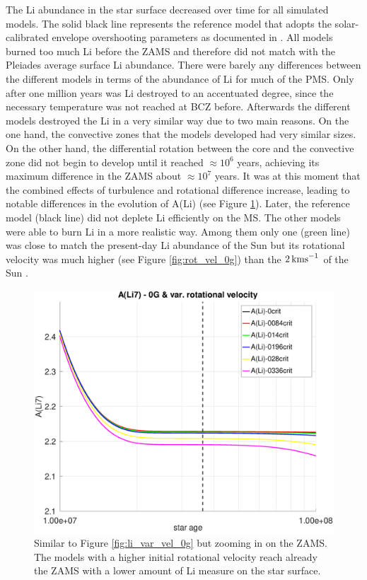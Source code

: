 \documentclass[fleqn,usenatbib]{mnras}
\begin{document}
The Li abundance in the star surface decreased over time for all simulated models. The solid black line represents the reference model that adopts the solar-calibrated envelope overshooting parameters as documented in \citet{Choi2016}. All models burned too much Li before the ZAMS and therefore did not match with the Pleiades average surface Li abundance. There were barely any differences between the different models in terms of the abundance of Li for much of the PMS. Only after one million years was Li destroyed to an accentuated degree, since the necessary temperature was not reached at BCZ before. Afterwards the different models destroyed the Li in a very similar way due to two main reasons. On the one hand, the convective zones that the models developed had very similar sizes. On the other hand, the differential rotation between the core and the convective zone did not begin to develop until it reached $ \approx 10^6$ years, achieving its maximum difference in the ZAMS about $ \approx 10^7$ years. It was at this moment that the combined effects of turbulence and rotational difference increase, leading to notable differences in the evolution of A(Li) (see Figure \ref{fig:li_var_vel_0g_z1}). Later, the reference model (black line) did not deplete Li efficiently on the MS. The other models were able to burn Li in a more realistic way. Among them only one (green line) was close to match the present-day Li abundance of the Sun but its rotational velocity was much higher (see Figure \ref{fig:rot_vel_0g}) than the $2\,\mathrm{kms}^{-1}$ of the Sun \citep{Gill2012}. \par

\begin{figure}
	\includegraphics[trim = 25mm 10mm 15mm 10mm clip,width=\columnwidth]{figures/paper1/li_var_vel_0_0g_z1.eps}
    \caption {Similar to Figure \ref{fig:li_var_vel_0g} but zooming in on the ZAMS. The models with a higher initial rotational velocity reach already the ZAMS with a lower amount of Li measure on the star surface.}
    \label{fig:li_var_vel_0g_z1}
\end{figure}
\end{document}
